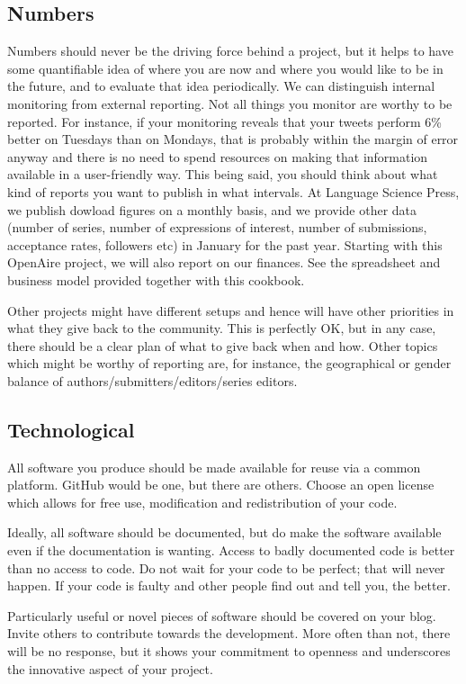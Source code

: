 \documentclass[guidelines,nonflat,modfonts] {langsci/langscibook}
\begin{document}
\subsection{Numbers}
Numbers should never be the driving force behind a project, but it helps to have some quantifiable idea of where you are now and where you would like to be in the future, and to evaluate that idea periodically. We can distinguish internal monitoring from external reporting. Not all things you monitor are worthy to be reported. For instance, if your monitoring reveals that your tweets perform 6\% better on Tuesdays than on Mondays, that is probably within the margin of error anyway and there is no need to spend resources on making that information available in a user-friendly way. This being said, you should think about what kind of reports you want to publish in what intervals. At Language Science Press, we publish dowload figures on a monthly basis, and we provide other data (number of series, number of expressions of interest, number of submissions, acceptance rates, followers etc) in January for the past year. Starting with this Open\-Aire project, we will also report on our finances. See the spreadsheet and business model provided together with this cookbook.

Other projects might have different setups and hence will have other priorities in what they give back to the community. This is perfectly OK, but in any case, there should be a clear plan of what to give back when and how. Other topics which might be worthy of reporting are, for instance, the geographical or gender balance of authors/submitters/editors/series editors.


\subsection{Technological}
All software you produce should be made available for reuse via a common platform. GitHub would be one, but there are others. Choose an open license which allows for free use, modification and redistribution of your code. 

Ideally, all software should be documented, but do make the software available even if the documentation is wanting. Access to badly documented code is better than no access to code. Do not wait for your code to be perfect; that will never happen. If your code is faulty and other people find out and tell you, the better.

Particularly useful or novel pieces of software should be covered on your blog. Invite others to contribute towards the development. More often than not, there will be no response, but it shows your commitment to openness and underscores the innovative aspect of your project. 
\end{document}
